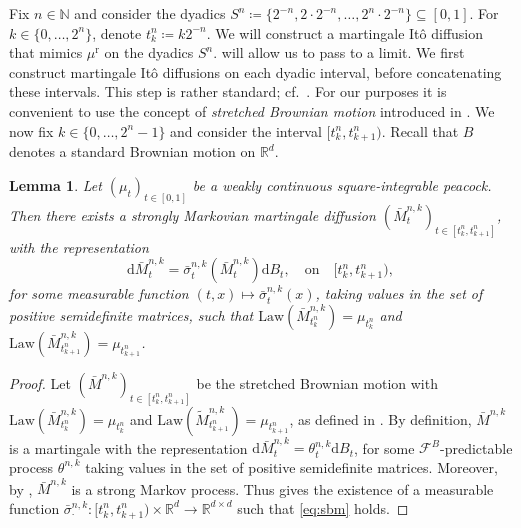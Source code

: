 \documentclass[12pt,oneside]{amsart}
\newtheorem{lemma}[theorem]{Lemma}
\theoremstyle{definition}
\newcommand{\F}{\mathcal F}
\newcommand{\Law}{\mathrm{Law}}
\newcommand{\D}{\mathrm{d}}
\newcommand{\N}{\mathbb N}
\newcommand{\R}{\mathbb R}
\newcommand{\reg}{\mathrm{r}}
\def\R{{\mathbb R}}
\numberwithin{equation}{section}
\begin{document}
Fix $n \in \N$ and consider the dyadics $S^n \coloneqq \{2^{-n}, 2\cdot 2^{-n}, \dotsc, 2^n\cdot 2^{-n}\}\subseteq [0,1]$. For $k \in \{0, \dotsc, 2^n\}$, denote $t^n_k \coloneqq k 2^{-n}$. We will construct a martingale It\^o diffusion that mimics $\mu^\reg$ on the dyadics $S^n$.  will allow us to pass to a limit. We first construct martingale It\^o diffusions on each dyadic interval, before concatenating these intervals. This step is rather standard; cf.~\cite{HiPrRoYo11, HiRoYo14}. For our purposes it is convenient to use the concept of \emph{stretched Brownian motion} introduced in \cite{BaBeHuKa20}. We now fix $k \in \{0, \dotsc, 2^n - 1\}$ and consider the interval $[t^n_k, t^n_{k + 1})$. Recall that $B$ denotes a standard Brownian motion on $\R^d$.

\begin{lemma}\label{lem:first-diffusion}
	Let $(\mu_t)_{t \in [0, 1]}$ be a weakly continuous square-integrable peacock. Then there exists a strongly Markovian martingale diffusion $(\bar{M}^{n, k}_t)_{t \in [t^n_k, t^n_{k +1}]}$, with the representation
	\begin{equation}\label{eq:sbm}
		\D \bar{M}^{n, k}_t = \bar{\sigma}^{n, k}_t(\bar{M}^{n, k}_t) \D B_t, \quad \text{on} \quad [t^n_k, t^n_{k + 1}),
	\end{equation}
	for some measurable function $(t, x) \mapsto \bar{\sigma}^{n, k}_t(x)$, taking values in the set of positive semidefinite matrices, such that $\Law(\bar{M}^{n, k}_{t^n_k}) = \mu_{t^n_k}$ and $\Law(\bar{M}^{n, k}_{t^n_{k + 1}}) = \mu_{t^n_{k+1}}$.
\end{lemma}

\begin{proof}
	Let $(\bar{M}^{n, k})_{t \in [t^n_k, t^n_{k +1}]}$ be the stretched Brownian motion with $\Law(\bar{M}^{n, k}_{t^n_k}) = \mu_{t^n_k}$ and $\Law(\tilde{M}^{n, k}_{t^n_{k+1}}) = \mu_{t^n_{k+1}}$, as defined in \cite[Definition 1.6]{BaBeHuKa20}. By definition, $\bar M^{n, k}$ is a martingale with the representation $\D \bar M^{n, k}_t = \theta^{n, k}_t \D B_t $, for some $\F^B$-predictable process $\theta^{n,k}$ taking values in the set of positive semidefinite matrices. Moreover, by \cite[Corollary 2.5]{BaBeHuKa20}, $\bar M^{n, k}$ is a strong Markov process. Thus  gives the existence of a measurable function $\bar{\sigma}^{n, k}_\cdot \colon [t^n_k, t^n_{k + 1}) \times \R^d \to \R^{d \times d}$ such that \eqref{eq:sbm} holds.
\end{proof}
\end{document}

